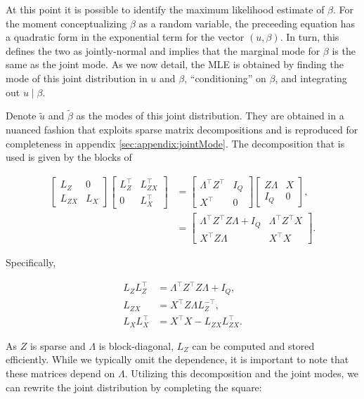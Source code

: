\documentclass[article,shortnames]{jss}
\begin{document}
At this point it is possible to identify the maximum likelihood
estimate of $\beta$. For the moment conceptualizing
$\beta$ as a random variable, the preceeding equation has a quadratic form in the
exponential term for the vector $(u, \beta)$. In turn, this
defines the two as
jointly-normal and implies that the marginal mode for $\beta$ is the
same as the joint mode. As we now detail, the MLE is obtained by finding the mode of
this joint distribution in $u$ and $\beta$, ``conditioning'' on
$\beta$, and integrating out $u \mid \beta$.

Denote $\tilde{u}$ and $\tilde{\beta}$ as the modes of this joint
distribution. They are obtained in a nuanced fashion that exploits
sparse matrix decompositions and is reproduced for completeness in
appendix \ref{sec:appendix:jointMode}. The decomposition that is used
is given by the blocks of

\begin{align*}
  \begin{bmatrix} L_Z & 0 \\ L_{ZX} & L_X \end{bmatrix}
  \begin{bmatrix} L_Z^\top & L_{ZX}^\top \\ 0 & L_X^\top \end{bmatrix}
  & = 
  \begin{bmatrix}\Lambda^\top Z^\top & I_Q \\ X^\top & 0 \end{bmatrix}
  \begin{bmatrix}Z \Lambda & X \\ I_Q & 0 \end{bmatrix},  \\
  & =  \begin{bmatrix} \Lambda^\top Z^\top Z \Lambda + I_Q & \Lambda^\top Z^\top X \\
  X^\top Z \Lambda & X^\top X \end{bmatrix}.
\end{align*}

\noindent Specifically,

\begin{align}
  \label{eq:blockDecomp}
  L_Z L_Z^\top & = \Lambda^\top Z^\top Z \Lambda + I_Q, \nonumber \\
  L_{ZX} & = X^\top Z \Lambda L_Z^{-\top}, \nonumber \\
  L_X L_X^\top & = X^\top X - L_{ZX} L_{ZX}^\top.
\end{align}

As $Z$ is sparse and $\Lambda$ is block-diagonal, $L_Z$ can be
computed and stored efficiently. While we typically omit the
dependence, it is important to note that these matrices depend on
$\Lambda$. Utilizing this decomposition and the
joint modes, we can rewrite the joint distribution by completing the square:
\end{document}
